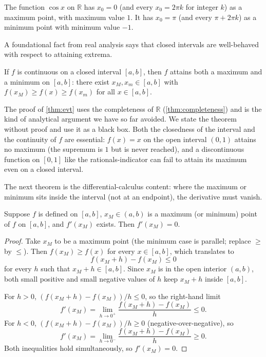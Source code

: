 \begin{example}
The function \(\cos x\) on \(\mathbb{R}\) has \(x_{0} = 0\) (and every \(x_{0} = 2\pi k\) for integer \(k\)) as a maximum point, with maximum value \(1\). It has \(x_{0} = \pi\) (and every \(\pi + 2\pi k\)) as a minimum point with minimum value \(-1\).
\end{example}

A foundational fact from real analysis says that closed intervals are well-behaved with respect to attaining extrema.

\begin{theorem}\label{thm:evt}
If \(f\) is continuous on a closed interval \([a, b]\), then \(f\) attains both a maximum and a minimum on \([a, b]\): there exist \(x_{M}, x_{m} \in [a, b]\) with \(f(x_{M}) \geq f(x) \geq f(x_{m})\) for all \(x \in [a, b]\).
\end{theorem}

\begin{remark}
The proof of \cref{thm:evt} uses the completeness of \(\mathbb{R}\) (\cref{thm:completeness}) and is the kind of analytical argument we have so far avoided. We state the theorem without proof and use it as a black box. Both the closedness of the interval and the continuity of \(f\) are essential: \(f(x) = x\) on the open interval \((0, 1)\) attains no maximum (the supremum is \(1\) but is never reached), and a discontinuous function on \([0, 1]\) like the rationals-indicator can fail to attain its maximum even on a closed interval.
\end{remark}

The next theorem is the differential-calculus content: where the maximum or minimum sits inside the interval (not at an endpoint), the derivative must vanish.

\begin{theorem}[Theorem A]\label{thm:interior-extrema}
Suppose \(f\) is defined on \([a, b]\), \(x_{M} \in (a, b)\) is a maximum (or minimum) point of \(f\) on \([a, b]\), and \(f'(x_{M})\) exists. Then \(f'(x_{M}) = 0\).
\end{theorem}

\begin{proof}
Take \(x_{M}\) to be a maximum point (the minimum case is parallel; replace \(\geq\) by \(\leq\)). Then \(f(x_{M}) \geq f(x)\) for every \(x \in [a, b]\), which translates to
\[
f(x_{M} + h) - f(x_{M}) \leq 0
\]
for every \(h\) such that \(x_{M} + h \in [a, b]\). Since \(x_{M}\) is in the open interior \((a, b)\), both small positive and small negative values of \(h\) keep \(x_{M} + h\) inside \([a, b]\).

For \(h > 0\), \((f(x_{M} + h) - f(x_{M}))/h \leq 0\), so the right-hand limit
\[
f'(x_{M}) = \lim_{h \to 0^{+}} \frac{f(x_{M} + h) - f(x_{M})}{h} \leq 0.
\]
For \(h < 0\), \((f(x_{M} + h) - f(x_{M}))/h \geq 0\) (negative-over-negative), so
\[
f'(x_{M}) = \lim_{h \to 0^{-}} \frac{f(x_{M} + h) - f(x_{M})}{h} \geq 0.
\]
Both inequalities hold simultaneously, so \(f'(x_{M}) = 0\).
\end{proof}

